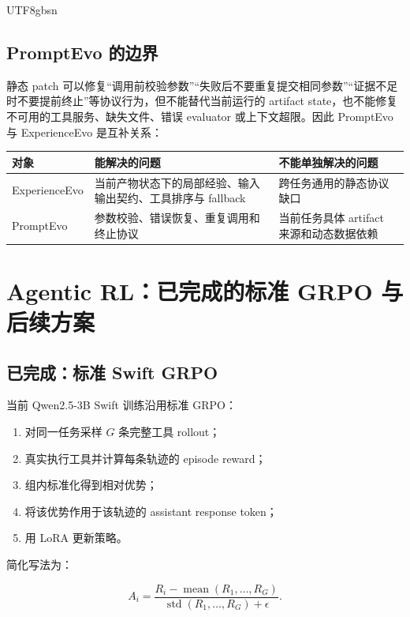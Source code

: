 \documentclass[a4paper,11pt]{article}
\begin{document}
\begin{CJK*}{UTF8}{gbsn}
\subsection{PromptEvo 的边界}

静态 patch 可以修复“调用前校验参数”“失败后不要重复提交相同参数”“证据不足时不要提前终止”等协议行为，但不能替代当前运行的 artifact state，也不能修复不可用的工具服务、缺失文件、错误 evaluator 或上下文超限。因此 PromptEvo 与 ExperienceEvo 是互补关系：

\begin{center}
\begin{tabularx}{0.92\textwidth}{lXX}
\toprule
对象 & 能解决的问题 & 不能单独解决的问题\\
\midrule
ExperienceEvo & 当前产物状态下的局部经验、输入输出契约、工具排序与 fallback & 跨任务通用的静态协议缺口\\
PromptEvo & 参数校验、错误恢复、重复调用和终止协议 & 当前任务具体 artifact 来源和动态数据依赖\\
\bottomrule
\end{tabularx}
\end{center}

\section{Agentic RL：已完成的标准 GRPO 与后续方案}

\subsection{已完成：标准 Swift GRPO}

当前 Qwen2.5-3B Swift 训练沿用标准 GRPO：

\begin{enumerate}
  \item 对同一任务采样 $G$ 条完整工具 rollout；
  \item 真实执行工具并计算每条轨迹的 episode reward；
  \item 组内标准化得到相对优势；
  \item 将该优势作用于该轨迹的 assistant response token；
  \item 用 LoRA 更新策略。
\end{enumerate}

简化写法为：

\begin{equation}
A_i=\frac{R_i-\operatorname{mean}(R_1,\ldots,R_G)}
{\operatorname{std}(R_1,\ldots,R_G)+\epsilon}.
\end{equation}


\end{CJK*}
\end{document}
